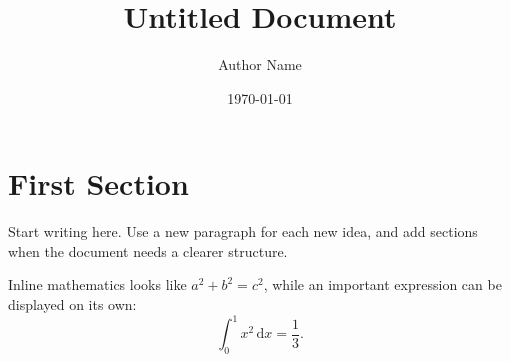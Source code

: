 \documentclass[11pt,a4paper]{article}
\title{Untitled Document}
\author{Author Name}
\date{\today}
\begin{document}
\maketitle

\section{First Section}

Start writing here. Use a new paragraph for each new idea, and add sections
when the document needs a clearer structure.

Inline mathematics looks like $a^2+b^2=c^2$, while an important expression
can be displayed on its own:
\[
  \int_0^1 x^2\,\mathrm{d}x = \frac{1}{3}.
\]
\end{document}
